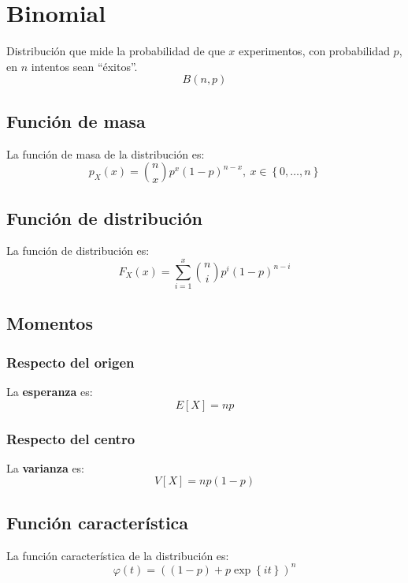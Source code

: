\section{Binomial}
\label{sec:binomial}
Distribución que mide la probabilidad de que $x$ experimentos, con probabilidad $p$, en $n$ intentos sean ``éxitos''. 
\[
\boxed{B\left( n, p \right)}
\]

\subsection{Función de masa}
La función de masa de la distribución es:
\[
p_X \left( x \right) = \binom{n}{x} p^x \left( 1-p \right)^{n-x},\ x \in \left\{ 0, \ldots, n \right\}
\]

\subsection{Función de distribución}
La función de distribución es:
\[
F_X\left( x \right) = \sum_{i=1}^{x} \binom{n}{i} p^i \left( 1-p \right)^{n-i}
\]

\subsection{Momentos}

\subsubsection*{Respecto del origen}
La \textbf{esperanza} es: 
\[
    E\left[ X \right] = np
\]
\subsubsection*{Respecto del centro}
La \textbf{varianza} es:
\[
    V\left[ X \right] = np\left( 1-p \right)
\]

\subsection{Función característica}
La función característica de la distribución es:
\[
\varphi\left( t \right) = \left( \left( 1-p \right) + p \exp\left\{ it \right\} \right)^n
\]

